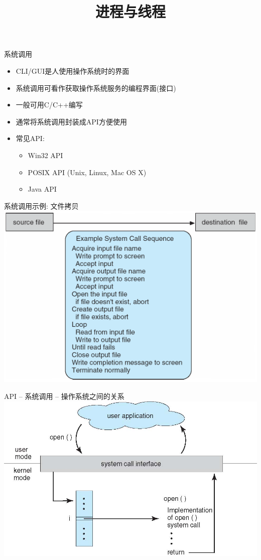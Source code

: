 \documentclass[xcolor=svgnames]{beamer}
\begin{document}
\begin{CJK*}{UTF8}{gbsn}


\title{进程与线程}

\begin{frame}{系统调用}
\begin{itemize}
\item CLI/GUI是人使用操作系统时的界面
\item 系统调用可看作获取操作系统服务的编程界面(接口)
\item 一般可用C/C++编写
\item 通常将系统调用封装成API方便使用
\item 常见API:
\begin{itemize}
\item Win32 API
\item POSIX API (Unix, Linux, Mac OS X)
\item Java API
\end{itemize}
\end{itemize}
\end{frame}

\begin{frame}{系统调用示例: 文件拷贝}
\includegraphics[width=1.0\textwidth]{syscall.png}
\end{frame}

\begin{frame}{API -- 系统调用 -- 操作系统之间的关系}
\includegraphics[width=1.0\textwidth]{syscall-os.jpg}
\end{frame}


\end{CJK*}
\end{document}
